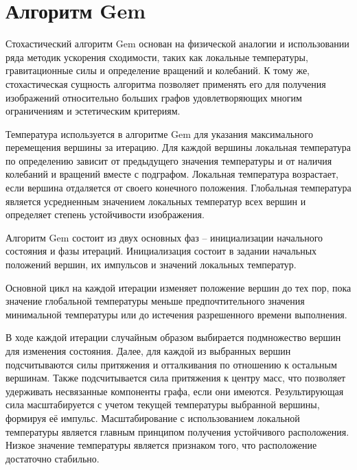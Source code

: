 \documentclass[a4paper,12pt]{report}
\begin{document}
\section{Алгоритм Gem}

Стохастический алгоритм Gem основан на физической  аналогии и использовании ряда методик ускорения сходимости, таких как локальные температуры, гравитационные силы и определение вращений и колебаний. К тому же, стохастическая сущность алгоритма позволяет применять его для получения изображений относительно больших графов удовлетворяющих многим ограничениям и эстетическим критериям.

Температура используется в алгоритме Gem для указания максимального перемещения вершины за итерацию. Для каждой вершины локальная температура по определению зависит от предыдущего значения температуры и от наличия колебаний и вращений вместе с подграфом. Локальная температура возрастает, если вершина отдаляется от своего конечного положения. Глобальная температура является усредненным значением локальных температур всех вершин и определяет степень устойчивости изображения.

Алгоритм Gem состоит из двух основных фаз – инициализации начального состояния и фазы итераций. Инициализация состоит в задании начальных положений вершин, их импульсов и значений локальных температур.

Основной цикл на каждой итерации изменяет положение вершин до тех пор, пока значение глобальной температуры меньше предпочтительного значения минимальной температуры или до истечения разрешенного времени выполнения.

В ходе каждой итерации случайным образом выбирается подмножество вершин для изменения состояния. Далее, для каждой из выбранных вершин подсчитываются силы притяжения и отталкивания по отношению к остальным вершинам. Также подсчитывается сила притяжения к центру масс, что позволяет удерживать несвязанные компоненты графа, если они имеются. Результирующая сила масштабируется с учетом текущей температуры выбранной вершины, формируя её импульс. Масштабирование с использованием локальной температуры является главным принципом получения устойчивого расположения. Низкое значение температуры является признаком того, что расположение достаточно стабильно.
\end{document}
